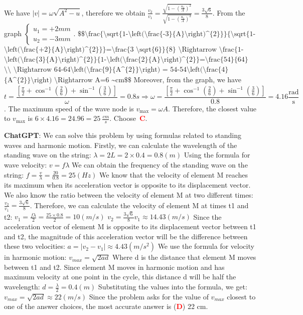\documentclass{article}
\begin{document}
{\begin{mdframed}[linewidth=1pt,linecolor=red]
		We have $ |v| =\omega \sqrt{A^2-u}$, therefore we obtain 
		$
		\frac{v_{2}}{v_{1}}=\frac{\sqrt{1-\left(\frac{u_{2}}{A}\right)^{2}}}{\sqrt{1-\left(\frac{u_{1}}{A}\right)^{2}}}=\frac{3 \sqrt{6}}{8}
		$. From the graph 
		$\left\{\begin{array}{l}
			u_{1}=+2 m m \\
			u_{2}=-3 m m
		\end{array} \right.
		$. 
		$$\frac{\sqrt{1-\left(\frac{-3}{A}\right)^{2}}}{\sqrt{1-\left(\frac{+2}{A}\right)^{2}}}=\frac{3 \sqrt{6}}{8} 
		\Rightarrow
		\frac{1-\left(\frac{3}{A}\right)^{2}}{1-\left(\frac{2}{A}\right)^{2}}=\frac{54}{64} \\
		\Rightarrow 
		64-64\left(\frac{9}{A^{2}}\right) = 54-54\left(\frac{4}{A^{2}}\right) \Rightarrow A=6 ~cm$$
		Moreover, from the graph, we have
		$$	t=\frac{\left[\frac{\pi}{2}+\cos ^{-1}\left(\frac{2}{6}\right)+\sin ^{-1}\left(\frac{3}{6}\right)\right]}{\omega}=0.8 s 
		\Rightarrow \omega=\frac{\left[\frac{\pi}{2}+\cos ^{-1}\left(\frac{2}{6}\right)+\sin ^{-1}\left(\frac{3}{6}\right)\right]}{0.8}=4.16 \frac{\mathrm{rad}}{\mathrm{s}} $$. 
		The maximum speed of the wave node is $	v_{\max }=\omega A	$. 	Therefore, the closest value to $v_{\max}$ is $6 \times 4.16 =24.96=25~\frac{cm}{s}$. Choose~\textcolor{red}{\textbf{C}}.
		
		\textbf{ChatGPT}: We can solve this problem by using formulas related to standing waves and harmonic motion. Firstly, we can calculate the wavelength of the standing wave on the string:
		$\lambda = 2L = 2 \times 0.4 = 0.8 (m)$
		Using the formula for wave velocity:
		$v = f \lambda$
		We can obtain the frequency of the standing wave on the string:
		$f = \frac{v}{\lambda} = \frac{20}{0.8} = 25 (Hz)$
		We know that the velocity of element M reaches its maximum when its acceleration vector is opposite to its displacement vector. We also know the ratio between the velocity of element M at two different times:
		$\frac{v_2}{v_1} = \frac{3\sqrt{6}}{8}$. Therefore, we can calculate the velocity of element M at times t1 and t2:
		$v_1 = \frac{f \lambda}{2} = \frac{25 \times 0.8}{2} = 10 (m/s)$
		$v_2 = \frac{3\sqrt{6}}{8} v_1 \approx 14.43 (m/s)$
		Since the acceleration vector of element M is opposite to its displacement vector between t1 and t2, the magnitude of this acceleration vector will be the difference between these two velocities:
		$a = \left| v_2 - v_1 \right| \approx 4.43 (m/s^2)$
		We use the formula for velocity in harmonic motion:
		$v_{max} = \sqrt{2ad}$
		Where d is the distance that element M moves between t1 and t2. Since element M moves in harmonic motion and has maximum velocity at one point in the cycle, this distance d will be half the wavelength:
		$d = \frac{\lambda}{2} = 0.4 (m)$
		Substituting the values into the formula, we get:
		$v_{max} = \sqrt{2ad} \approx 22 (m/s)$
		Since the problem asks for the value of $v_{max}$ closest to one of the answer choices, the most accurate answer is (\textcolor{red}{\textbf{D}}) 22 cm.
		

\end{mdframed}}
\end{document}
